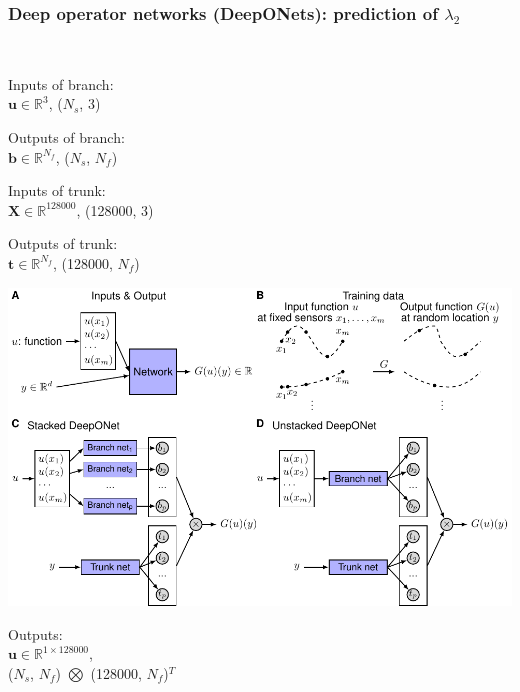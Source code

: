 \documentclass[aspectratio=169]{beamer}
\begin{document}
\begin{frame}
  \frametitle{Deep operator networks (DeepONets): prediction of $\lambda_2$}\
  
\begin{minipage}{0.30\textwidth}
    Inputs of branch: \\$\mathbf{u} \in \mathbb{R}^3$, ($N_s$, 3)

    Outputs of branch: \\$\boldsymbol{b} \in \mathbb{R}^{N_f}$, ($N_s$, $N_f$)

    \vspace{\baselineskip}

    Inputs of trunk: \\$\mathbf{X} \in \mathbb{R}^{128000}$, (128000, 3)

    Outputs of trunk: \\$\boldsymbol{t} \in \mathbb{R}^{N_f}$, (128000, $N_f$)
\end{minipage}
\begin{minipage}{0.30\textwidth}
    \includegraphics[width=\textwidth, trim={10.05cm 0cm 0cm 4.8cm}, clip]{deeponet.pdf}
\end{minipage}
\begin{minipage}{0.35\textwidth}

  Outputs: \\$\boldsymbol{u} \in \mathbb{R}^{1\times128000}$, \\($N_s$, $N_f$) $\bigotimes$ (128000, $N_f$)$^{T}$

\end{minipage}
\end{frame}

\end{document}
